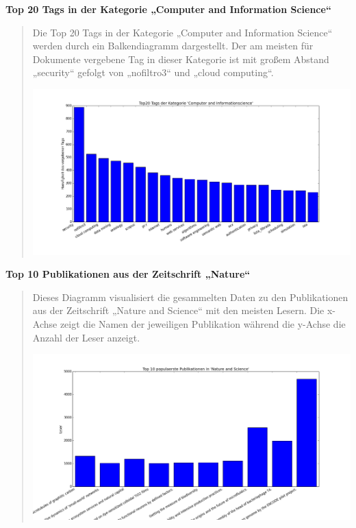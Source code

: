 \documentclass[letterpaper,10pt,english]{sphinxmanual}
\begin{document}
\textbf{Top 20 Tags in der Kategorie „Computer and Information Science“}
\begin{quote}

Die Top 20 Tags in der Kategorie „Computer and Information Science“ werden durch ein Balkendiagramm dargestellt. Der am meisten für Dokumente vergebene Tag in dieser Kategorie ist mit großem Abstand „security“ gefolgt von „nofiltro3“ und „cloud computing“.

\includegraphics{Top20Tags.png}
\end{quote}

\textbf{Top 10 Publikationen aus der Zeitschrift „Nature“}
\begin{quote}

Dieses Diagramm visualisiert die gesammelten Daten zu den Publikationen aus der Zeitschrift „Nature and Science“ mit den meisten Lesern. Die x-Achse zeigt die Namen der jeweiligen Publikation während die y-Achse die Anzahl der Leser anzeigt.

\includegraphics{top10_NS.png}
\end{quote}
\end{document}
